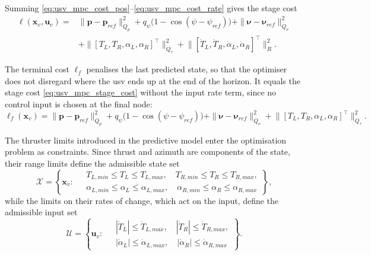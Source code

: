Summing \eqref{eq:usv_mpc_cost_pos}--\eqref{eq:usv_mpc_cost_rate} gives the stage cost
\begin{equation}
    \begin{aligned}
        \ell(\mathbf{x}_v, \mathbf{u}_v) = {} & \|\mathbf{p}-\mathbf{p}_{ref}\|^2_{Q_p} + q_\psi\big(1-\cos(\psi-\psi_{ref})\big) + \|\boldsymbol{\nu}-\boldsymbol{\nu}_{ref}\|^2_{Q_\nu} \\
        & + \big\|[T_L,T_R,\alpha_L,\alpha_R]^\top\big\|^2_{Q_\tau} + \big\|[\dot{T}_L, \dot{T}_R, \dot{\alpha}_L, \dot{\alpha}_R]^\top\big\|^2_{R}.
    \end{aligned}
    \label{eq:usv_mpc_stage_cost}
\end{equation}

The terminal cost $\ell_f$ penalises the last predicted state, so that the optimiser does not disregard where the \gls{usv} ends up at the end of the horizon. It equals the stage cost \eqref{eq:usv_mpc_stage_cost} without the input rate term, since no control input is chosen at the final node:
\begin{equation}
    \ell_f(\mathbf{x}_v) = \|\mathbf{p}-\mathbf{p}_{ref}\|^2_{Q_p} + q_\psi\big(1-\cos(\psi-\psi_{ref})\big) + \|\boldsymbol{\nu}-\boldsymbol{\nu}_{ref}\|^2_{Q_\nu} + \big\|[T_L,T_R,\alpha_L,\alpha_R]^\top\big\|^2_{Q_\tau}.
    \label{eq:usv_mpc_terminal_cost}
\end{equation}
 
The thruster limits introduced in the predictive model enter the optimisation problem as constraints. Since thrust and azimuth are components of the state, their range limits define the admissible state set
\begin{equation}
    \mathcal{X} = \left\{ \mathbf{x}_v : \;
    \begin{aligned}
        & T_{L,min} \le T_L \le T_{L,max}, \quad T_{R,min} \le T_R \le T_{R,max}, \\
        & \alpha_{L,min} \le \alpha_L \le \alpha_{L,max}, \quad \alpha_{R,min} \le \alpha_R \le \alpha_{R,max}
    \end{aligned}
    \right\},
    \label{eq:usv_mpc_set_X}
\end{equation}
while the limits on their rates of change, which act on the input, define the admissible input set
\begin{equation}
    \mathcal{U} = \left\{ \mathbf{u}_v : \;
    \begin{aligned}
        & |\dot{T}_L| \le \dot{T}_{L,max}, \quad |\dot{T}_R| \le \dot{T}_{R,max}, \\
        & |\dot{\alpha}_L| \le \dot{\alpha}_{L,max}, \quad |\dot{\alpha}_R| \le \dot{\alpha}_{R,max}
    \end{aligned}
    \right\}.
    \label{eq:usv_mpc_set_U}
\end{equation}

